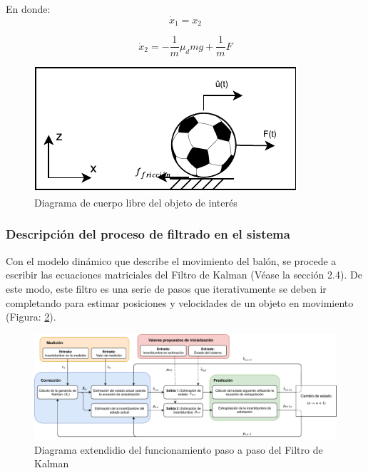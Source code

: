 En donde:
\begin{equation}
\dot{x}_1 = x_2
\label{eq:state_variable_1}
\end{equation}

\begin{equation}
\dot{x}_2 = -\frac{1}{m}\mu_d m g + \frac{1}{m}F
\label{eq:state_variable_2}
\end{equation}


\begin{figure}
\centering
\includegraphics[scale=1.5]{images/dynamic_model.pdf}
\caption{Diagrama de cuerpo libre del objeto de interés}
\label{fig:dynamic_model}
\end{figure}

		\subsubsection*{Descripción del proceso de filtrado en el sistema}
Con el modelo dinámico que describe el movimiento del balón, se procede a escribir las ecuaciones matriciales del Filtro de Kalman (Véase la sección 2.4). De este modo, este filtro es una serie de pasos que iterativamente se deben ir completando para estimar posiciones y velocidades de un objeto en movimiento (Figura: \ref{fig:kalman_extended_diagram}).

\begin{figure}
\centering
\includegraphics[scale=0.6]{images/kalman_extended_diagram.pdf}
\caption{Diagrama extendidio del funcionamiento paso a paso del Filtro de Kalman}
\label{fig:kalman_extended_diagram}
\end{figure}

